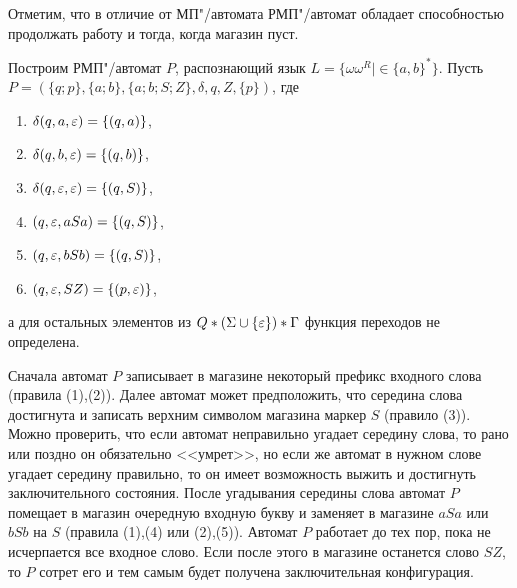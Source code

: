 Отметим, что в отличие от МП"/автомата РМП"/автомат обладает способностью продолжать работу и тогда, когда магазин пуст.

\begin{myexample}
Построим РМП"/автомат $P$, распознающий язык $L=\{\omega\omega^R\mid\in\{a,b\}^*\}$. Пусть $P=(\{q;p\},\{a;b\},\{a;b;S;Z\},\delta,q,Z,\{p\})$, где

\begin{enumerate}
\item $\delta(q,a,\varepsilon) = \{(q,a)\}$,
\item $\delta(q,b,\varepsilon) = \{(q,b)\}$,
\item $\delta(q,\varepsilon,\varepsilon) = \{(q,S)\}$,
\item $(q,\varepsilon,aSa) = \{(q,S)\}$,
\item $(q,\varepsilon,bSb) = \{(q,S)\}$,
\item $(q,\varepsilon,SZ) = \{(p,\varepsilon)\}$,
\end{enumerate}
а для остальных элементов из $Q*(\Sigma\cup\{\varepsilon\})*\Gamma$ функция переходов не определена.

Сначала автомат $P$ записывает в магазине некоторый префикс входного слова (правила (1),(2)). Далее автомат может предположить, что середина слова достигнута и записать верхним символом магазина маркер $S$ (правило (3)). Можно проверить, что если автомат неправильно угадает середину слова, то рано или поздно он обязательно <<умрет>>, но если же автомат в нужном слове угадает середину правильно, то он имеет возможность выжить и достигнуть заключительного состояния. После угадывания середины слова автомат $P$ помещает в магазин очередную входную букву и заменяет в магазине $aSa$ или $bSb$ на $S$ (правила (1),(4) или (2),(5)). Автомат $P$ работает до тех пор, пока не исчерпается все входное слово. Если после этого в магазине останется слово $SZ$, то $P$ сотрет его и тем самым будет получена заключительная конфигурация.


\end{myexample}
